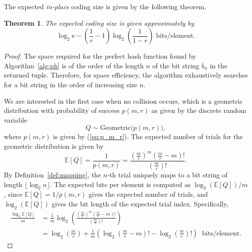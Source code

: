\documentclass[hidelinks,11pt,final]{article}
\newcommand{\envnumstyle}{section}
\theoremstyle{plain}
\newtheorem{theorem}{Theorem}[\envnumstyle]
\newcommand{\geodist}{\mathrm{Geometric}}
\newcommand{\Expect}[1]{\mathbb{E}\left[#1\right]}
\begin{document}
The expected \emph{in-place} coding size is given by the following theorem.
\begin{theorem}
The expected coding size is given approximately by
\begin{equation}
\label{eq:code_size}
    \log_2 \mathrm{e} - \left(\frac{1}{r} - 1\right) \log_2\!\left(\frac{1}{1-r}\right) \text{ bits/element}.
\end{equation}
\end{theorem}
\begin{proof}
The space required for the perfect hash function found by Algorithm~\ref{alg:ph} is of the order of the length $n$ of the bit string $b_n$ in the returned tuple. Therefore, for space efficiency, the algorithm exhaustively searches for a bit string in the order of increasing size $n$.

We are interested in the first case when no collision occurs, which is a geometric distribution with probability of success $p(m,r)$ as given by the discrete random variable
\begin{equation}
    Q \sim \geodist\!\bigl(p\!\left(m,r\right)\bigr),
\end{equation}
where $p(m,r)$ is given by (\ref{eq:p_m_r}). The expected number of trials for the geometric distribution is given by
\begin{equation}
    \Expect{Q} = \frac{1}{p(m,r)} = \frac{\left(\frac{m}{r}\right)^m \left(\frac{m}{r}-m\right)!}{\left(\frac{m}{r}\right)!}.
\end{equation}
By Definition~\ref{def:mapping}, the $n$-th trial uniquely maps to a bit string of length $\lfloor \log_2 n \rfloor$. The expected bits per element is computed as $\log_2(\Expect{Q})/m$, since $\Expect{Q} = 1/p(m,r)$ gives the expected number of trials, and $\log_2(\Expect{Q})$ gives the bit length of the expected trial index. Specifically,
\begin{align}
    \frac{\log_2 \Expect{Q}}{m}
        &= \frac{1}{m}\log_2\!\left(\frac{\left(\frac{m}{r}\right)^m \left(\frac{m}{r}-m\right)!}{\left(\frac{m}{r}\right)!}\right)\\
        &= \log_2\!\left(\frac{m}{r}\right) + \frac{1}{m}\left(
            \log_2\!\left(\frac{m}{r}-m\right)! - \log_2\!\left(\frac{m}{r}\right)!\right) \; \text{ bits/element}.
\end{align}

\end{proof}
\end{document}
